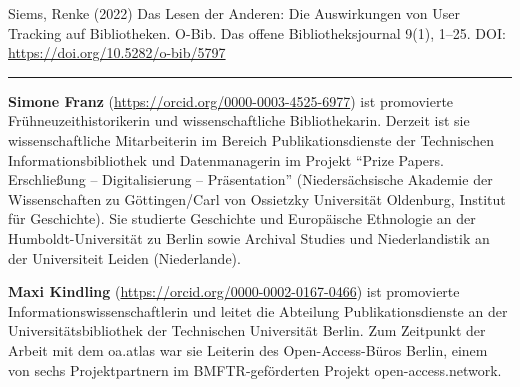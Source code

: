 \documentclass[a4paper,
fontsize=11pt,
oneside,
numbers=noperiodatend,
parskip=half-,
bibliography=totoc,
final
]{scrartcl}
\begin{document}
Siems, Renke (2022) Das Lesen der Anderen: Die Auswirkungen von User
Tracking auf \mbox{Bibliotheken}. O-Bib. Das offene Bibliotheksjournal 9(1),
1--25. DOI: \url{https://doi.org/10.5282/o-bib/5797}

\begin{center}\rule{0.5\linewidth}{0.5pt}\end{center}

\textbf{Simone Franz} (\url{https://orcid.org/0000-0003-4525-6977}) ist
promovierte Frühneuzeithistorikerin und wissenschaftliche
Bibliothekarin. Derzeit ist sie wissenschaftliche Mitarbeiterin im
Bereich Publikationsdienste der Technischen Informationsbibliothek und
Datenmanagerin im Projekt \enquote{Prize Papers. Erschließung --
Digitalisierung -- Präsentation} (Niedersächsische Akademie der
Wissenschaften zu Göttingen/Carl von Ossietzky Universität Oldenburg,
Institut für Geschichte). Sie studierte Geschichte und Europäische
Ethnologie an der Humboldt-Universität zu Berlin sowie Archival Studies
und Niederlandistik an der Universiteit Leiden (Niederlande).

\textbf{Maxi Kindling} (\url{https://orcid.org/0000-0002-0167-0466}) ist promovierte Informationswissenschaftlerin und
leitet die Abteilung Publikationsdienste an der Universitätsbibliothek
der Technischen Universität Berlin. Zum Zeitpunkt der Arbeit mit dem
oa.atlas war sie Leiterin des Open-Access-Büros Berlin, einem von sechs
Projektpartnern im BMFTR-geförderten Projekt open-access.network.
\end{document}
